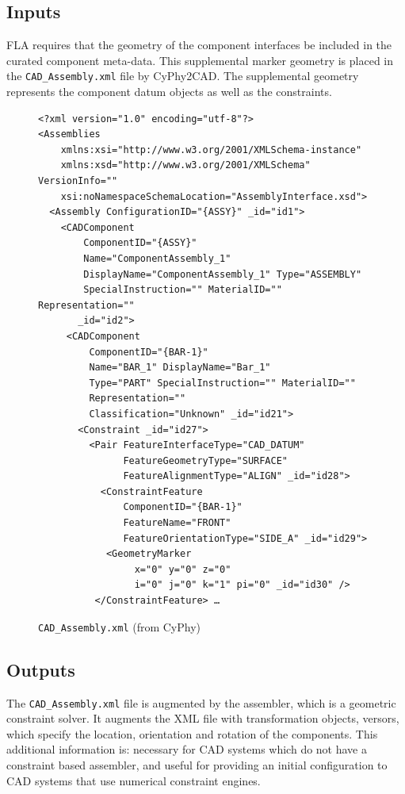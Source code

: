 \documentclass[]{report}
\begin{document}
\subsection{Inputs}

FLA requires that the geometry of the component interfaces be included in the curated component meta-data.  
This supplemental marker geometry is placed in the \texttt{CAD\_Assembly.xml} file by CyPhy2CAD.  
The supplemental geometry represents the component datum objects as well as the constraints.

\begin{figure}
\begin{lstlisting}
<?xml version="1.0" encoding="utf-8"?>
<Assemblies  
    xmlns:xsi="http://www.w3.org/2001/XMLSchema-instance" 
    xmlns:xsd="http://www.w3.org/2001/XMLSchema" VersionInfo=""     
    xsi:noNamespaceSchemaLocation="AssemblyInterface.xsd">
  <Assembly ConfigurationID="{ASSY}" _id="id1">
    <CADComponent  
        ComponentID="{ASSY}" 
        Name="ComponentAssembly_1"
        DisplayName="ComponentAssembly_1" Type="ASSEMBLY"
        SpecialInstruction="" MaterialID="" Representation=""
       _id="id2">
     <CADComponent 
         ComponentID="{BAR-1}" 
         Name="BAR_1" DisplayName="Bar_1"
         Type="PART" SpecialInstruction="" MaterialID=""
         Representation=""
         Classification="Unknown" _id="id21">
       <Constraint _id="id27">
         <Pair FeatureInterfaceType="CAD_DATUM"
               FeatureGeometryType="SURFACE"           
               FeatureAlignmentType="ALIGN" _id="id28">
           <ConstraintFeature 
               ComponentID="{BAR-1}" 
               FeatureName="FRONT"
               FeatureOrientationType="SIDE_A" _id="id29">
            <GeometryMarker 
                 x="0" y="0" z="0" 
                 i="0" j="0" k="1" pi="0" _id="id30" />
          </ConstraintFeature> …
\end{lstlisting}
\caption{\texttt{CAD\_Assembly.xml} (from CyPhy)}
\end{figure}



\subsection{Outputs} 

The \texttt{CAD\_Assembly.xml} file is augmented by the assembler, which is a geometric constraint solver.  
It augments the XML file with transformation objects, versors, 
which specify the location, orientation and rotation of the components.
This additional information is:
necessary for CAD systems which do not have a constraint based assembler, and
useful for providing an initial configuration to CAD systems that use numerical constraint engines.
\end{document}
